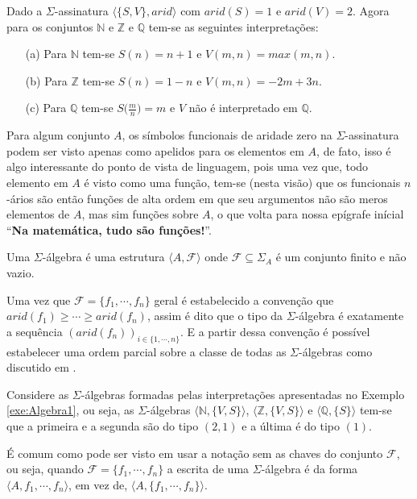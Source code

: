 \begin{exemplo}\label{exe:Algebra1}
  Dado a $\Sigma$-assinatura  $\langle \{S, V\}, arid \rangle$ com $arid(S) = 1$ e $arid(V) = 2$. Agora para os conjuntos $\mathbb{N}$ e $\mathbb{Z}$ e $\mathbb{Q}$ tem-se as seguintes interpretações:
  \begin{itemize}
    \item[(a)] Para $\mathbb{N}$ tem-se $S(n) = n + 1$ e $V(m, n) = max(m, n)$.
    \item[(b)] Para $\mathbb{Z}$ tem-se $S(n) = 1 - n $ e $V(m, n) = -2m + 3n$.
    \item[(c)] Para $\mathbb{Q}$ tem-se $S\Big(\frac{m}{n}\Big) = m$ e $V$ não é interpretado em $\mathbb{Q}$.
  \end{itemize}
\end{exemplo}

Para algum conjunto $A$, os símbolos funcionais de aridade zero na $\Sigma$-assinatura podem ser visto apenas como apelidos para os elementos em $A$, de fato, isso é algo interessante do ponto de vista de linguagem, pois uma vez que, todo elemento em $A$ é visto como uma função, tem-se (nesta visão) que os funcionais $n$-ários são então funções de alta ordem em que seu argumentos não são meros elementos de $A$, mas sim funções sobre $A$, o que volta para nossa epígrafe inícial ``\textbf{Na matemática, tudo são funções!}''.

\begin{definicao}\label{def:SigmaAlgebra}
  Uma $\Sigma$-álgebra é uma estrutura $\langle A, \mathcal{F} \rangle$ onde $\mathcal{F} \subseteq \Sigma_A$ é um conjunto finito e não vazio.
\end{definicao}

Uma vez que $\mathcal{F} = \{f_1, \cdots, f_n\}$ geral é estabelecido a convenção que $arid(f_1) \geq \cdots \geq arid(f_n)$, assim é dito que o tipo da $\Sigma$-álgebra é exatamente a sequência $(arid(f_n))_{i \in \{1, \cdots, n\}}$. E a partir dessa convenção é possível estabelecer uma ordem parcial sobre a classe de todas as $\Sigma$-álgebras como discutido em \cite{denecke2018}.

\begin{exemplo}
  Considere as $\Sigma$-álgebras formadas pelas interpretações apresentadas no Exemplo \ref{exe:Algebra1}, ou seja, as $\Sigma$-álgebras $\langle \mathbb{N}, \{V, S\} \rangle$, $\langle \mathbb{Z}, \{V, S\} \rangle$ e $\langle \mathbb{Q}, \{S\} \rangle$ tem-se que a primeira e a segunda são do tipo $(2, 1)$ e a última é do tipo $(1)$.
\end{exemplo}

\begin{atencao}
  É comum como pode ser visto em \cite{burris1981, denecke2018, carmo2013} usar a notação sem as chaves do conjunto $\mathcal{F}$, ou seja, quando $\mathcal{F} = \{f_1, \cdots, f_n\}$ a escrita de uma $\Sigma$-álgebra é da forma $\langle A, f_1, \cdots, f_n \rangle$, em vez de, $\langle A, \{f_1, \cdots, f_n\} \rangle$.
\end{atencao}

